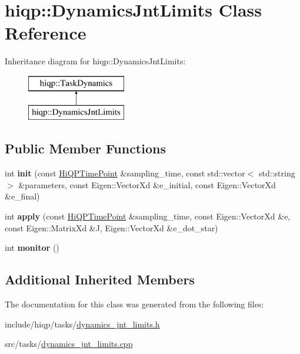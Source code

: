 \hypertarget{classhiqp_1_1DynamicsJntLimits}{\section{hiqp\-:\-:Dynamics\-Jnt\-Limits Class Reference}
\label{classhiqp_1_1DynamicsJntLimits}
}
Inheritance diagram for hiqp\-:\-:Dynamics\-Jnt\-Limits\-:\begin{figure}[H]
\begin{center}
\leavevmode
\includegraphics[height=2.000000cm]{classhiqp_1_1DynamicsJntLimits}
\end{center}
\end{figure}
\subsection*{Public Member Functions}
\begin{DoxyCompactItemize}
\item 
\hypertarget{classhiqp_1_1DynamicsJntLimits_aca0cb3a30a1d071e4cd958737e45cd26}{int {\bfseries init} (const \hyperlink{classhiqp_1_1HiQPTimePoint}{Hi\-Q\-P\-Time\-Point} \&sampling\-\_\-time, const std\-::vector$<$ std\-::string $>$ \&parameters, const Eigen\-::\-Vector\-Xd \&e\-\_\-initial, const Eigen\-::\-Vector\-Xd \&e\-\_\-final)}\label{classhiqp_1_1DynamicsJntLimits_aca0cb3a30a1d071e4cd958737e45cd26}

\item 
\hypertarget{classhiqp_1_1DynamicsJntLimits_a881943d401858f2c43134e96ee65b4e9}{int {\bfseries apply} (const \hyperlink{classhiqp_1_1HiQPTimePoint}{Hi\-Q\-P\-Time\-Point} \&sampling\-\_\-time, const Eigen\-::\-Vector\-Xd \&e, const Eigen\-::\-Matrix\-Xd \&J, Eigen\-::\-Vector\-Xd \&e\-\_\-dot\-\_\-star)}\label{classhiqp_1_1DynamicsJntLimits_a881943d401858f2c43134e96ee65b4e9}

\item 
\hypertarget{classhiqp_1_1DynamicsJntLimits_a65cdb43f439c451ca9279cfdc8ea6dc8}{int {\bfseries monitor} ()}\label{classhiqp_1_1DynamicsJntLimits_a65cdb43f439c451ca9279cfdc8ea6dc8}

\end{DoxyCompactItemize}
\subsection*{Additional Inherited Members}


The documentation for this class was generated from the following files\-:\begin{DoxyCompactItemize}
\item 
include/hiqp/tasks/\hyperlink{dynamics__jnt__limits_8h}{dynamics\-\_\-jnt\-\_\-limits.\-h}\item 
src/tasks/\hyperlink{dynamics__jnt__limits_8cpp}{dynamics\-\_\-jnt\-\_\-limits.\-cpp}\end{DoxyCompactItemize}
